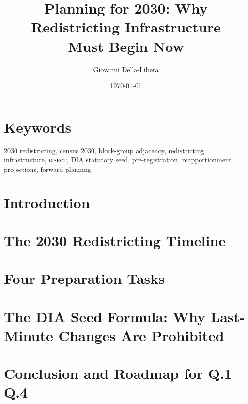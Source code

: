 \documentclass[12pt]{article}
\title{\textbf{Planning for 2030: Why Redistricting Infrastructure\\
Must Begin Now}}
\author{Giovanni Della-Libera}
\date{\today}
\begin{document}
\maketitle

\begin{abstract}

\end{abstract}

\section*{Keywords}
2030 redistricting, census 2030, block-group adjacency, redistricting infrastructure,
\textsc{bisect}, DIA statutory seed, pre-registration, reapportionment projections,
forward planning

\section{Introduction}


\section{The 2030 Redistricting Timeline}


\section{Four Preparation Tasks}


\section{The DIA Seed Formula: Why Last-Minute Changes Are Prohibited}


\section{Conclusion and Roadmap for Q.1--Q.4}




\end{document}
